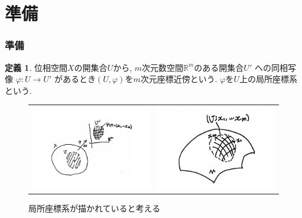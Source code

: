 \documentclass[dvipdfmx,cjk]{beamer}
\theoremstyle{definition}
\newtheorem{dfn}{\textbf{ 定義 }}
\begin{document}
\section{準備}
\begin{frame}
\frametitle{準備} 
\begin{dfn}
位相空間$X$の開集合$U$から, $m$次元数空間$\mathbb{R}^m$のある開集合$U'$
への同相写像
$\varphi : U\rightarrow U'$
があるとき$(U, \varphi)$を$m$次元座標近傍という. 
$\varphi$を$U$上の局所座標系という.
\end{dfn}
\begin{figure}[H]
  \begin{tabular}{cc}
    \begin{minipage}[t]{0.45\hsize}
      \centering
      \includegraphics[keepaspectratio, scale=0.2]{coNeighborhoodBig.pdf}
      \caption{$U$上の局所座標系}
      \label{}
    \end{minipage} &
    \begin{minipage}[t]{0.45\hsize}
      \centering
      \includegraphics[keepaspectratio, scale=0.2]{DrawnLocalCoSysBig.pdf}
      \caption{局所座標系が描かれていると考える}
      \label{}
    \end{minipage}
  \end{tabular}
\end{figure}
\end{frame}
\end{document}
